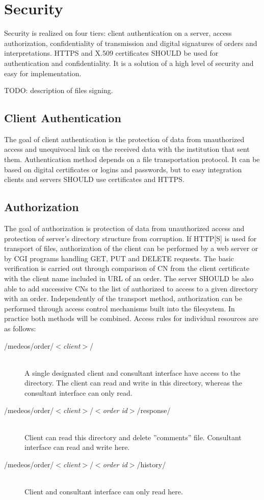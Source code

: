 \documentclass[a4paper]{article}
\begin{document}
\section{Security}
\label{sec:bezp}

Security is realized on four tiers: client authentication on a server, access authorization, 
confidentiality of transmission and digital signatures of orders and interpretations. 
HTTPS and X.509 certificates SHOULD be used for authentication and confidentiality. It is a 
solution of a high level of security and easy for implementation.

TODO: description of files signing.

\subsection{Client Authentication} 

The goal of client authentication is the protection of data from unauthorized access and
unequivocal link on the received data with the institution that sent them.
Authentication method depends on a file transportation
protocol. It can be based on digital certificates or logins and passwords, but to easy
integration clients and servers SHOULD use certificates and HTTPS.

\subsection{Authorization}

The goal of authorization is protection of data from unauthorized access and protection
of server's directory structure from corruption. If HTTP[S] is used for transport of files, 
authorization of the client can be performed by a web server or by CGI programs handling GET, 
PUT and DELETE requests. The basic verification is carried out through comparison of CN from 
the client certificate with the client name included in URL of an order. The server SHOULD 
be also able to add successive CNs to the list of authorized to access to a given directory 
with an order. Independently of the transport method, authorization can be performed through 
access control mechanisms built into the filesystem. In practice both methods will be combined. 
Access rules for individual resources are as follows:
\begin{description}
  \item[/medeos/order/$<$\textit{client}$>$/]\hfill\\
  A single designated client and consultant interface have access to the directory. The 
  client can read and write in this directory, whereas the consultant interface can only read.
  \item[/medeos/order/$<$\textit{client}$>$/$<$\textit{order id}$>$/response/]\hfill\\ 
  Client can read this directory and delete ''comments'' file. Consultant interface can
  read and write here.
  \item[/medeos/order/$<$\textit{client}$>$/$<$\textit{order id}$>$/history/]\hfill\\ 
  Client and consultant interface can only read here. 
\end{description}
\end{document}
